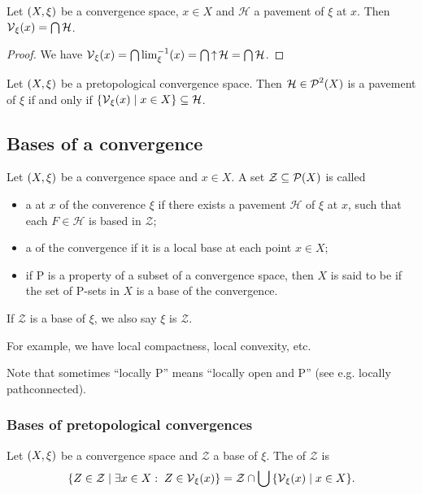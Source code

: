 \begin{lemma} \label{vicinityMeetOfPavement}
Let $\sSet{X,\xi}$ be a convergence space, $x\in X$ and $\mathcal{H}$ a pavement of $\xi$ at $x$. Then $\operatorname{\mathcal{V}}_\xi(x) = \bigcap\mathcal{H}$.
\end{lemma}
\begin{proof}
We have $\operatorname{\mathcal{V}}_\xi(x) = \bigcap\lim^{-1}_{\xi}(x) = \bigcap\operatorname{\uparrow}\mathcal{H} = \bigcap\mathcal{H}$.
\end{proof}

\begin{lemma}
Let $\sSet{X,\xi}$ be a pretopological convergence space. Then $\mathcal{H}\in\operatorname{\mathcal{P}}^2(X)$ is a pavement of $\xi$ \textup{if and only if} $\setbuilder{\vicinity_\xi(x)}{x\in X} \subseteq \mathcal{H}$.
\end{lemma}

\subsection{Bases of a convergence}
\begin{definition}
Let $\sSet{X,\xi}$ be a convergence space and $x\in X$. A set $\mathcal{Z}\subseteq \operatorname{\mathcal{P}}(X)$ is called
\begin{itemize}
\item a  at $x$ of the converence $\xi$ if there exists a pavement $\mathcal{H}$ of $\xi$ at $x$, such that each $F\in\mathcal{H}$ is based in $\mathcal{Z}$;
\item a  of the convergence if it is a local base at each point $x\in X$;
\item if $\mathrm{P}$ is a property of a subset of a convergence space, then $X$ is said to be  if the set of $\mathrm{P}$-sets in $X$ is a base of the convergence. 
\end{itemize}
If $\mathcal{Z}$ is a base of $\xi$, we also say $\xi$ is  $\mathcal{Z}$.
\end{definition}
For example, we have local compactness, local convexity, etc.

Note that sometimes ``locally $\mathrm{P}$'' means ``locally open and $\mathrm{P}$'' (see e.g. locally pathconnected).  

\subsubsection{Bases of pretopological convergences}
\begin{definition}
Let $\sSet{X,\xi}$ be a convergence space and $\mathcal{Z}$ a base of $\xi$. The  of $\mathcal{Z}$ is
\[ \setbuilder{Z\in \mathcal{Z}}{\exists x\in X: \; Z\in \vicinity_\xi(x)} = \mathcal{Z}\cap \bigcup\setbuilder{\vicinity_\xi(x)}{x\in X}. \]
\end{definition}

